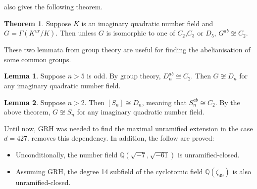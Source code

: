 \documentclass[12pt]{extarticle}
\newcommand{\Q}{\mathbb{Q}}
\newcommand{\<}{\langle}
\renewcommand{\>}{\rangle}
\theoremstyle{definition}
\newtheorem{theorem}{Theorem}
\newtheorem{lemma}{Lemma}
\begin{document}
\cite{YAMAMURA1996} also gives the following theorem. 
\begin{theorem}
Suppose $K$ is an imaginary quadratic number field and $G = \Gamma(K^{ur}/K)$.  Then unless $G$ is isomorphic to one of $C_2$,$C_3$ or $D_5$, $G^{ab} \not \cong C_2$. 
\end{theorem}
These two lemmata from group theory are useful for finding the abelianisation of some common groups. 
\begin{lemma}
Suppose $n>5$ is odd. By group theory, $D_n^{ab} \cong C_2$. Then $G \not \cong D_n$ for any imaginary quadratic number field.
\end{lemma}
\begin{lemma}
Suppose $n>2$. Then $[S_n] \cong D_n$, meaning that $S_n^{ab} \cong C_2$. By the above theorem, $G \not \cong S_n$ for any imaginary quadratic number field.
\end{lemma}
Until now, GRH was needed to find the maximal unramified extension in the case $d = 427$. \cite{Wong2015} removes this dependency. In addition, the follow are proved:
\begin{itemize}
\item Unconditionally, the number field $\Q(\sqrt{-7},\sqrt{-61})$ is unramified-closed.
\item  Assuming GRH, the degree 14 subfield of the cyclotomic field $\Q(\zeta_49)$ is also unramified-closed. 
\end{itemize}
\end{document}
